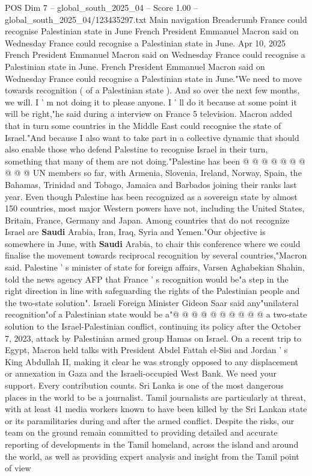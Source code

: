 \begin{textsample}{POS Dim 7 – global\_south\_2025\_04 – Score 1.00 – global\_south\_2025\_04/123435297.txt}  \label{ex:f7_pos_146}
Main navigation Breadcrumb France could recognise Palestinian state in June French President Emmanuel Macron said on Wednesday France could recognise a Palestinian state in June.
Apr 10, 2025 French President Emmanuel Macron said on Wednesday France could recognise a Palestinian state in June.
French President Emmanuel Macron said on Wednesday France could recognise a Palestinian state in June."We need to move towards recognition ( of a Palestinian state ).
And so over the next few months, we will.
I ' m not doing it to please anyone.
I ' ll do it because at some point it will be right,"he said during a interview on France 5 television.
Macron added that in turn some countries in the Middle East could recognise the state of Israel."And because I also want to take part in a collective dynamic that should also enable those who defend Palestine to recognise Israel in their turn, something that many of them are not doing."Palestine has been @ @ @ @ @ @ @ @ @ @ UN members so far, with Armenia, Slovenia, Ireland, Norway, Spain, the Bahamas, Trinidad and Tobago, Jamaica and Barbados joining their ranks last year.
Even though Palestine has been recognized as a sovereign state by almost 150 countries, most major Western powers have not, including the United States, Britain, France, Germany and Japan.
Among countries that do not recognize Israel are \textbf{Saudi} Arabia, Iran, Iraq, Syria and Yemen."Our objective is somewhere in June, with \textbf{Saudi} Arabia, to chair this conference where we could finalise the movement towards reciprocal recognition by several countries,"Macron said.
Palestine ' s minister of state for foreign affairs, Varsen Aghabekian Shahin, told the news agency AFP that France ' s recognition would be"a step in the right direction in line with safeguarding the rights of the Palestinian people and the two-state solution".
Israeli Foreign Minister Gideon Saar said any"unilateral recognition"of a Palestinian state would be a"@ @ @ @ @ @ @ @ @ @ a two-state solution to the Israel-Palestinian conflict, continuing its policy after the October 7, 2023, attack by Palestinian armed group Hamas on Israel.
On a recent trip to Egypt, Macron held talks with President Abdel Fattah el-Sisi and Jordan ' s King Abdullah II, making it clear he was strongly opposed to any displacement or annexation in Gaza and the Israeli-occupied West Bank.
We need your support.
Every contribution counts.
Sri Lanka is one of the most dangerous places in the world to be a journalist.
Tamil journalists are particularly at threat, with at least 41 media workers known to have been killed by the Sri Lankan state or its paramilitaries during and after the armed conflict.
Despite the risks, our team on the ground remain committed to providing detailed and accurate reporting of developments in the Tamil homeland, across the island and around the world, as well as providing expert analysis and insight from the Tamil point of view

\end{textsample}
